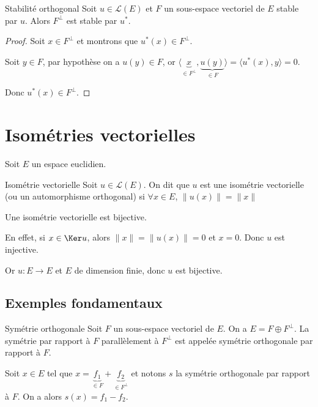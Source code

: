 \begin{theoreme}{Stabilité orthogonal}{}
    Soit $u \in \mathscr L(E)$ et $F$ un sous-espace vectoriel de $E$ stable par $u$. 
    Alors $F^\perp$ est stable par $u^*$.
\end{theoreme}

\begin{proof}
    Soit $x \in F^\perp$ et montrons que $u^*(x) \in F^\perp$. 

    Soit $y \in F$, par hypothèse on a $u(y) \in F$, or $\langle \underbrace{x}_{\in F^\perp}, \underbrace{u(y)}_{\in F} \rangle = \langle u^*(x), y \rangle  = 0$.

    Donc $u^*(x) \in F^\perp$. 
\end{proof}

\section{Isométries vectorielles}

Soit $E$ un espace euclidien.

\begin{definition}{Isométrie vectorielle}{}
    Soit $u \in \mathscr L(E)$. On dit que $u$ est une isométrie vectorielle (ou un automorphisme 
    orthogonal) si $\forall x \in E$, $\| u(x) \| = \| x \|$ 
\end{definition}

\begin{remarque}
    Une isométrie vectorielle est bijective. 

    En effet, si $x \in \Ker u$, alors $\| x \| = \| u(x) \| = 0$ et $x = 0$. Donc $u$ est injective.

    Or $u : E \to E$ et $E$ de dimension finie, donc $u$ est bijective. 
\end{remarque}

\subsection{Exemples fondamentaux}

\begin{definition}{Symétrie orthogonale}{}
    Soit $F$ un sous-espace vectoriel de $E$. On a $E = F \oplus F^\perp$.
    La symétrie par rapport à $F$ parallèlement à $F^\perp$ est appelée 
    symétrie orthogonale par rapport à $F$. 
\end{definition}


Soit $x \in E$ tel que $x = \underbrace{f_1}_{\in F} + \underbrace{f_2}_{\in F^\perp}$
et notons $s$ la symétrie orthogonale par rapport à $F$. 
On a alors $s(x) = f_1 - f_2$.

